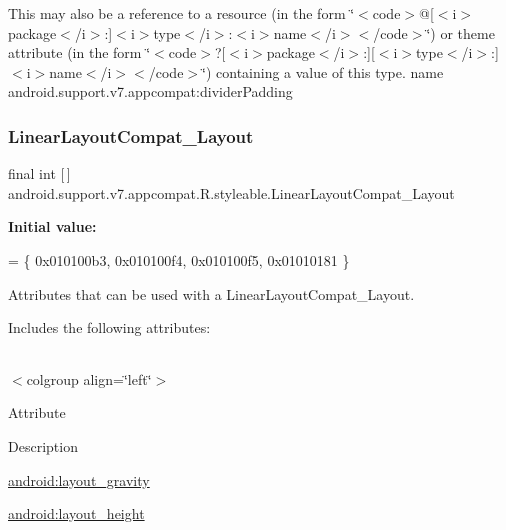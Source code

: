 This may also be a reference to a resource (in the form \char`\"{}$<$code$>$@\mbox{[}$<$i$>$package$<$/i$>$\+:\mbox{]}$<$i$>$type$<$/i$>$\+:$<$i$>$name$<$/i$>$$<$/code$>$\char`\"{}) or theme attribute (in the form \char`\"{}$<$code$>$?\mbox{[}$<$i$>$package$<$/i$>$\+:\mbox{]}\mbox{[}$<$i$>$type$<$/i$>$\+:\mbox{]}$<$i$>$name$<$/i$>$$<$/code$>$\char`\"{}) containing a value of this type.  name android.\+support.\+v7.\+appcompat\+:divider\+Padding \mbox{\label{classandroid_1_1support_1_1v7_1_1appcompat_1_1R_1_1styleable_abdf078c09964c82c7af689bed5e6f564}} 
\subsubsection{\texorpdfstring{Linear\+Layout\+Compat\+\_\+\+Layout}{LinearLayoutCompat\_Layout}}
{\footnotesize\ttfamily final int \mbox{[}$\,$\mbox{]} android.\+support.\+v7.\+appcompat.\+R.\+styleable.\+Linear\+Layout\+Compat\+\_\+\+Layout\hspace{0.3cm}{\ttfamily [static]}}

{\bfseries Initial value\+:}
\begin{DoxyCode}
= \{
            0x010100b3, 0x010100f4, 0x010100f5, 0x01010181
        \}
\end{DoxyCode}
Attributes that can be used with a Linear\+Layout\+Compat\+\_\+\+Layout. 

Includes the following attributes\+:

\tabulinesep=1mm
\begin{longtabu} spread 0pt [c]{*{0}{|X[-1]}|}
\hline
\end{longtabu}
$<$colgroup align=\char`\"{}left\char`\"{}$>$ 

Attribute

Description 

{\ttfamily \hyperlink{classandroid_1_1support_1_1v7_1_1appcompat_1_1R_1_1styleable_a74cba1962f48bb8a5e322a56f2701a54}{android\+:layout\+\_\+gravity}}

{\ttfamily \hyperlink{classandroid_1_1support_1_1v7_1_1appcompat_1_1R_1_1styleable_ab19ac17e3b2ed7081664217655762b35}{android\+:layout\+\_\+height}}

